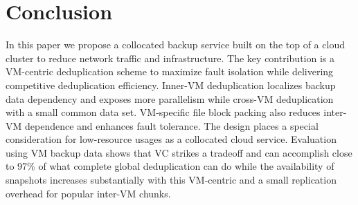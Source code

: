 \section{Conclusion}
\label{sect:conclusion}
In this paper we propose a collocated backup service built on
the top of a cloud cluster to reduce network traffic and infrastructure.
The key contribution is a VM-centric deduplication scheme to 
maximize fault isolation while delivering competitive deduplication efficiency.
Inner-VM deduplication localizes backup data dependency and exposes more parallelism  
while cross-VM deduplication with a small common data set.
VM-specific file block packing also reduces inter-VM dependence and enhances fault tolerance.
The design places a special consideration for low-resource usages as a collocated cloud service.
Evaluation using  VM backup data shows that VC strikes a tradeoff and 
can accomplish close to 97\% of what complete global
deduplication can do while the availability of snapshots increases substantially with this VM-centric
and a small replication overhead for popular inter-VM chunks.

